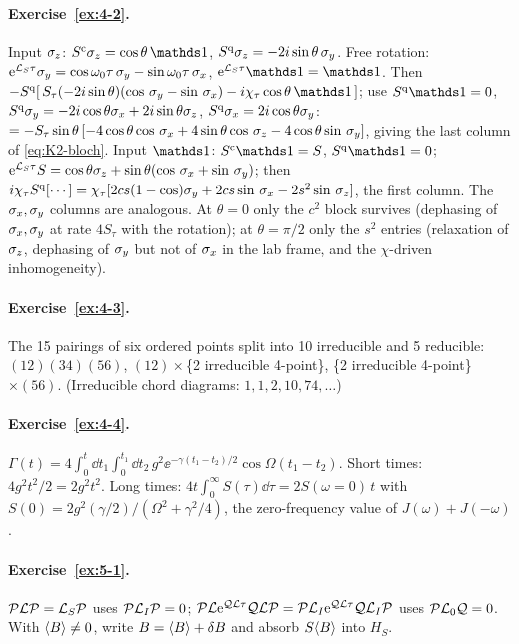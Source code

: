 \paragraph{Exercise~\ref{ex:4-2}.}
Input $\sigma_z$: $S^\cl\sz=\cos\theta\,\Id$, $S^{\mathrm{q}}\sigma_z=-2i\sin\theta\,\sigma_y$.
Free rotation: $\mathrm{e}^{\mathcal{L}_S\tau}\sigma_y=\cos\omega_0\tau\,\sigma_y-\sin\omega_0\tau\,\sigma_x$, $\ee^{\Lc_S\tau}\Id=\Id$.
Then $-S^\qu[\,S_\tau(-2i\sin\theta)(\cos\,\sy-\sin\,\sx)-i\chi_\tau\cos\theta\,\Id\,]$; use $S^\qu\Id=0$, $S^{\mathrm{q}}\sigma_y=-2i\cos\theta\sigma_x+2i\sin\theta\sigma_z$, $S^{\mathrm{q}}\sigma_x=2i\cos\theta\sigma_y$: $=-S_\tau\sin\theta\,[-4\cos\theta\cos\,\sigma_x+4\sin\theta\cos\,\sigma_z-4\cos\theta\sin\,\sigma_y]$, giving the last column of \cref{eq:K2-bloch}.
Input $\Id$: $S^\cl\Id=S$, $S^\qu\Id=0$; $\mathrm{e}^{\mathcal{L}_S\tau}S=\cos\theta\sigma_z+\sin\theta(\cos\,\sigma_x+\sin\,\sigma_y)$; then $i\chi_\tau S^{\mathrm{q}}[\cdots]=\chi_\tau[2cs(1-\cos)\sigma_y+2cs\sin\,\sigma_x-2s^2\sin\,\sigma_z]$, the first column.
The $\sigma_x,\sigma_y$ columns are analogous.
At $\theta=0$ only the $c^2$ block survives (dephasing of $\sigma_x,\sigma_y$ at rate $4S_\tau$ with the rotation); at $\theta=\pi/2$ only the $s^2$ entries (relaxation of $\sigma_z$, dephasing of $\sigma_y$ but not of $\sigma_x$ in the lab frame, and the $\chi$-driven inhomogeneity).

\paragraph{Exercise~\ref{ex:4-3}.}
The 15 pairings of six ordered points split into 10 irreducible and 5 reducible: $(12)(34)(56)$, $(12)\times$\{2 irreducible 4-point\}, \{2 irreducible 4-point\}$\times(56)$.
(Irreducible chord diagrams: $1,1,2,10,74,\dots$)

\paragraph{Exercise~\ref{ex:4-4}.}
$\Gamma(t)=4\int_0^t\dd t_1\int_0^{t_1}\dd t_2\,g^2\ee^{-\gamma(t_1-t_2)/2}\cos\Omega(t_1-t_2)$.
Short times: $4g^2t^2/2=2g^2t^2$.
Long times: $4t\int_0^\infty S(\tau)\dd\tau=2S(\omega{=}0)\,t$ with $S(0)=2g^2(\gamma/2)/(\Omega^2+\gamma^2/4)$, the zero-frequency value of $J(\omega)+J(-\omega)$.

\paragraph{Exercise~\ref{ex:5-1}.}
$\mathcal{P}\mathcal{L}\mathcal{P}=\mathcal{L}_S\mathcal{P}$ uses $\mathcal{P}\mathcal{L}_I\mathcal{P}=0$; $\mathcal{P}\mathcal{L}\mathrm{e}^{\mathcal{Q}\mathcal{L}\tau}\mathcal{Q}\mathcal{L}\mathcal{P}=\mathcal{P}\mathcal{L}_I\mathrm{e}^{\mathcal{Q}\mathcal{L}\tau}\mathcal{Q}\mathcal{L}_I\mathcal{P}$ uses $\mathcal{P}\mathcal{L}_0\mathcal{Q}=0$.
With $\langle B\rangle\ne0$, write $B=\langle B\rangle+\delta B$ and absorb $S\langle B\rangle$ into $H_S$.

